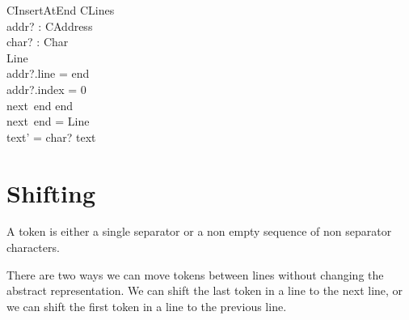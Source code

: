 \documentclass{article}
\begin{document}
\begin{schema}{CInsertAtEnd}
  CLines \\
  addr? : CAddress \\
  char? : Char \\
  \Delta Line \\
\where
  addr?.line = end \\
  addr?.index = 0 \\
  next~end \neq end \\
  next~end = \theta Line \\
  text' = \langle char? \rangle \cat text 
\end{schema}

\section{Shifting}

A token is either a single separator or a non empty sequence of non
separator characters.

There are two ways we can move tokens between lines without changing
the abstract representation. We can shift the last token in a line to
the next line, or we can shift the first token in a line to the previous
line. 
\end{document}
